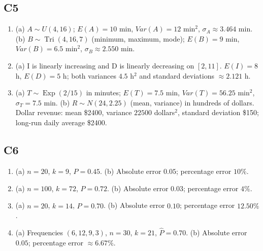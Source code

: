 {\subsection*{C5}
\begin{enumerate}[label=\textbf{C5.\arabic*.}]
\item (a) $A\sim U(4,16)$; $E(A)=10$ min, $Var(A)=12$ min$^2$, $\sigma_A\approx3.464$ min.
(b) $B\sim\operatorname{Tri}(4,16,7)$ (minimum, maximum, mode);
$E(B)=9$ min, $Var(B)=6.5$ min$^2$, $\sigma_B\approx2.550$ min.
\item (a) I is linearly increasing and D is linearly decreasing on $[2,11]$.
$E(I)=8$ h, $E(D)=5$ h; both variances $4.5$ h$^2$ and
standard deviations $\approx2.121$ h.
\item (a) $T\sim\operatorname{Exp}(2/15)$ in minutes;
$E(T)=7.5$ min, $Var(T)=56.25$ min$^2$, $\sigma_T=7.5$ min.
(b) $R\sim N(24,2.25)$ (mean, variance) in hundreds of dollars.
Dollar revenue: mean \$2400, variance $22500$ dollars$^2$,
standard deviation \$150; long-run daily average \$2400.
\end{enumerate}
\subsection*{C6}
\begin{enumerate}[label=\textbf{C6.\arabic*.}]
\item (a) $n=20$, $k=9$, $\widehat P=0.45$.
(b) Absolute error $0.05$; percentage error $10\%$.
\item (a) $n=100$, $k=72$, $\widehat P=0.72$.
(b) Absolute error $0.03$; percentage error $4\%$.
\item (a) $n=20$, $k=14$, $\widehat P=0.70$.
(b) Absolute error $0.10$; percentage error $12.50\%$.
\item (a) Frequencies $(6,12,9,3)$, $n=30$, $k=21$, $\widehat P=0.70$.
(b) Absolute error $0.05$; percentage error $\approx6.67\%$.
\end{enumerate}
}
